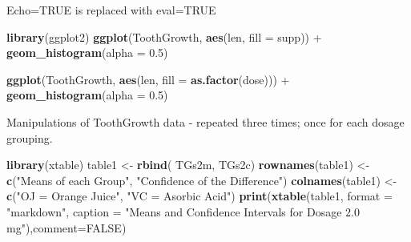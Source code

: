 \documentclass[]{article}
\newenvironment{Shaded}{\begin{snugshade}}{\end{snugshade}}
\newcommand{\KeywordTok}[1]{\textcolor[rgb]{0.13,0.29,0.53}{\textbf{{#1}}}}
\newcommand{\DataTypeTok}[1]{\textcolor[rgb]{0.13,0.29,0.53}{{#1}}}
\newcommand{\DecValTok}[1]{\textcolor[rgb]{0.00,0.00,0.81}{{#1}}}
\newcommand{\FloatTok}[1]{\textcolor[rgb]{0.00,0.00,0.81}{{#1}}}
\newcommand{\StringTok}[1]{\textcolor[rgb]{0.31,0.60,0.02}{{#1}}}
\newcommand{\CommentTok}[1]{\textcolor[rgb]{0.56,0.35,0.01}{\textit{{#1}}}}
\newcommand{\OtherTok}[1]{\textcolor[rgb]{0.56,0.35,0.01}{{#1}}}
\newcommand{\NormalTok}[1]{{#1}}
\begin{document}
Echo=TRUE is replaced with eval=TRUE

\begin{Shaded}
\begin{Highlighting}[]
\KeywordTok{library}\NormalTok{(ggplot2)}
\KeywordTok{ggplot}\NormalTok{(ToothGrowth, }\KeywordTok{aes}\NormalTok{(len, }\DataTypeTok{fill =} \NormalTok{supp)) +}\StringTok{ }\KeywordTok{geom_histogram}\NormalTok{(}\DataTypeTok{alpha =} \FloatTok{0.5}\NormalTok{)}

\KeywordTok{ggplot}\NormalTok{(ToothGrowth, }\KeywordTok{aes}\NormalTok{(len, }\DataTypeTok{fill =} \KeywordTok{as.factor}\NormalTok{(dose))) +}\StringTok{ }\KeywordTok{geom_histogram}\NormalTok{(}\DataTypeTok{alpha =} \FloatTok{0.5}\NormalTok{)}
\end{Highlighting}
\end{Shaded}

Manipulations of ToothGrowth data - repeated three times; once for each
dosage grouping.

\begin{Shaded}
\end{Shaded}

\begin{Shaded}
\begin{Highlighting}[]
\KeywordTok{library}\NormalTok{(xtable)}
\NormalTok{table1 <-}\StringTok{ }\KeywordTok{rbind}\NormalTok{( TGs2m, TGs2c)}
\KeywordTok{rownames}\NormalTok{(table1) <-}\StringTok{ }\KeywordTok{c}\NormalTok{(}\StringTok{"Means of each Group"}\NormalTok{, }\StringTok{"Confidence of the Difference"}\NormalTok{)}
\KeywordTok{colnames}\NormalTok{(table1) <-}\StringTok{ }\KeywordTok{c}\NormalTok{(}\StringTok{"OJ = Orange Juice"}\NormalTok{, }\StringTok{"VC = Asorbic Acid"}\NormalTok{)}
\KeywordTok{print}\NormalTok{(}\KeywordTok{xtable}\NormalTok{(table1, }\DataTypeTok{format =} \StringTok{"markdown"}\NormalTok{, }\DataTypeTok{caption =} \StringTok{"Means and Confidence Intervals for Dosage 2.0 mg"}\NormalTok{),}\DataTypeTok{comment=}\OtherTok{FALSE}\NormalTok{)}
\end{Highlighting}
\end{Shaded}
\end{document}
